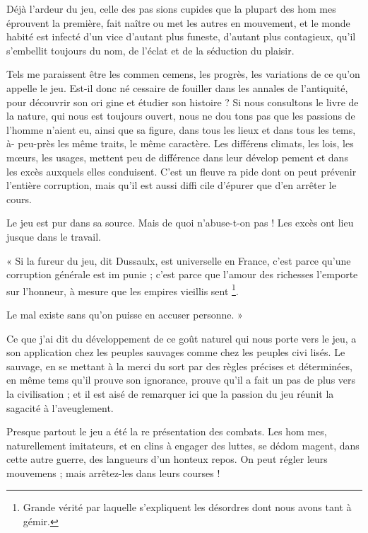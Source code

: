 Déjà l'ardeur du jeu, celle des pas%
sions cupides que la plupart des hom%
mes éprouvent la première, fait naître
ou met les autres en mouvement, et
le monde habité est infecté d'un vice
d'autant plus funeste, d'autant plus
contagieux, qu'il s'embellit toujours
du nom, de l'éclat et de la séduction
du plaisir.

Tels me paraissent être les commen%
cemens, les progrès, les variations de
ce qu'on appelle le jeu. Est-il donc né%
cessaire de fouiller dans les annales de
l'antiquité, pour découvrir son ori%
gine et étudier son histoire ? Si nous
consultons le livre de la nature, qui
nous est toujours ouvert, nous ne dou%
tons pas que les passions de l'homme
n'aient eu, ainsi que sa figure, dans
tous les lieux et dans tous les tems, à-%
peu-près les même traits, le même
caractère. Les différens climats, les
lois, les mœurs, les usages, mettent
peu de différence dans leur dévelop%
pement et dans les excès auxquels
elles conduisent. C'est un fleuve ra%
pide dont on peut prévenir l'entière
corruption, mais qu'il est aussi diffi%
cile d'épurer que d'en arrêter le cours.

Le jeu est pur dans sa source. Mais
de quoi n'abuse-t-on pas ! Les excès
ont lieu jusque dans le travail.

« Si la fureur du jeu, dit Dussaulx,
est universelle en France, c'est parce
qu'une corruption générale est im%
punie ; c'est parce que l'amour des
richesses l'emporte sur l'honneur,
à mesure que les empires vieillis%
sent
\footnote{Grande vérité par laquelle s'expliquent
les désordres dont nous avons tant à gémir.}.

Le mal existe sans qu'on puisse
en accuser personne. »

Ce que j'ai dit du développement de
ce goût naturel qui nous porte vers le
jeu, a son application chez les peuples
sauvages comme chez les peuples civi%
lisés. Le sauvage, en se mettant à la
merci du sort par des règles précises
et déterminées, en même tems qu'il 
prouve son ignorance, prouve qu'il a
fait un pas de plus vers la civilisation ;
et il est aisé de remarquer ici que la
passion du jeu réunit la sagacité à
l'aveuglement.

Presque partout le jeu a été la re%
présentation des combats. Les hom%
mes, naturellement imitateurs, et en%
clins à engager des luttes, se dédom%
magent, dans cette autre guerre, des
langueurs d'un honteux repos. On
peut régler leurs mouvemens ; mais
arrêtez-les dans leurs courses !

